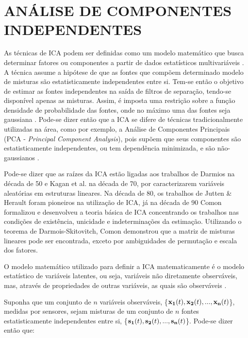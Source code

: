 \documentclass[a4paper,12pt]{monografia}
\theoremstyle{plain}
\theoremstyle{definition}
\theoremstyle{remark}
\begin{document}
\chapter{ANÁLISE DE COMPONENTES INDEPENDENTES}
\label{ch:ica}

As técnicas de ICA podem ser definidas como um modelo matemático que busca determinar fatores ou componentes a partir de dados estatísticos multivariáveis \cite{leite2004separaccao}. A técnica assume a hipótese de que as fontes que compõem determinado modelo de misturas são estatisticamente independentes entre si. Tem-se então o objetivo de estimar as fontes independentes na saída de filtros de separação, tendo-se disponível apenas as misturas. Assim, é imposta uma restrição sobre a função densidade de probabilidade das fontes, onde no máximo uma das fontes seja gaussiana \cite{cavalcante2004separaccao}. Pode-se dizer então que a ICA se difere de técnicas tradicionalmente utilizadas na área, como por exemplo, a Análise de Componentes Principais (PCA - \textit{Principal Component Analysis}), pois supõem que seus componentes são estatisticamente independentes, ou tem dependência minimizada, e são não-gaussianos \cite{leite2013analise}.  

Pode-se dizer que as raízes da ICA estão ligadas aos trabalhos de Darmios \cite{darmois1953analyse} na década de 50 e Kagan et al. \cite{kagan1973characterization} na década de 70, por caracterizarem variáveis aleatórias em estruturas lineares. Na década de 80, os trabalhos de Jutten \& Herault \cite{herault1986space} foram pioneiros na utilização de ICA, já na década de 90 Comon \cite{comon1994independent} formalizou e desenvolveu a teoria básica de ICA concentrando os trabalhos nas condições de existência, unicidade e indeterminações da estimação. Utilizando o teorema de Darmois-Skitovitch, Comon demonstrou que a matriz de misturas lineares pode ser encontrada, exceto por ambiguidades de permutação e escala dos fatores.

O modelo matemático utilizado para definir a ICA matematicamente é o modelo estatístico de variáveis latentes, ou seja, variáveis não diretamente observáveis, mas, através de propriedades de outras variáveis, as quais são observáveis \cite{faier2011analise}. 

Suponha que um conjunto de $n$ variáveis observáveis, \{${{\bf x_{1}} ( t ), {\bf x_{2}} ( t ), ..., {\bf x_{n}} ( t )}$\}, medidas por sensores, sejam misturas de um conjunto de $n$ fontes estatisticamente independentes entre si, \{${{\bf s_{1} } ( t ), {\bf s_{2} } ( t ), ..., {\bf s_{n} } ( t )}$\}. Pode-se dizer então que:
\end{document}
